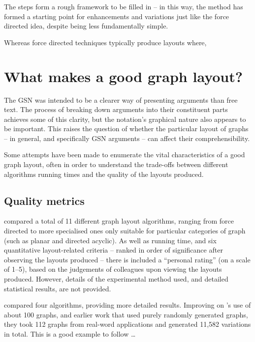 The steps form a rough framework to be filled in -- in this way, the method has formed a starting point for enhancements and variations just like the force directed idea, despite being less fundamentally simple.

Whereas force directed techniques typically produce layouts where, 


\section{What makes a good graph layout? \label{sec:whatmakesgood}}

The GSN was intended to be a clearer way of presenting arguments than free text.
The process of breaking down arguments into their constituent parts achieves some of this clarity,
but the notation's graphical nature also appears to be important.
This raises the question of whether the particular layout of graphs -- in general, and specifically GSN arguments -- can affect their comprehensibility.

Some attempts have been made to enumerate the vital characteristics of a good graph layout, often in order to understand the trade-offs between different algorithms running times and the quality of the layouts produced.


\subsection{Quality metrics}

\citet{Himsolt95comparingand} compared a total of 11 different graph layout algorithms, ranging from force directed to more specialised ones only suitable for particular categories of graph (such as planar and directed acyclic).
As well as running time, and six quantitative layout-related criteria -- ranked in order of significance after observing the layouts produced -- there is included a ``personal rating'' (on a scale of 1--5), based on the judgements of colleagues upon viewing the layouts produced.
However, details of the experimental method used, and detailed statistical results, are not provided.

\citet{DiBattista1997303} compared four algorithms, providing more detailed results.
Improving on \citeauthor{Himsolt95comparingand}'s use of about 100 graphs, and earlier work that used purely randomly generated graphs, they took 112 graphs from real-word applications and generated 11,582 variations in total. This is a good example to follow \ldots

